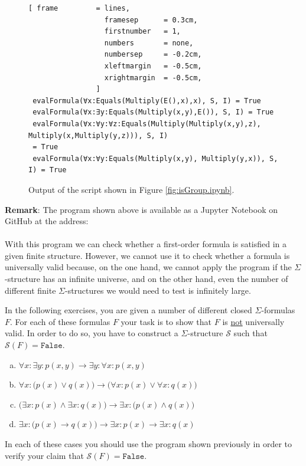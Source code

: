 \begin{figure}[!ht]
\centering
\begin{Verbatim}[ frame         = lines, 
                  framesep      = 0.3cm, 
                  firstnumber   = 1,
                  numbers       = none,
                  numbersep     = -0.2cm,
                  xleftmargin   = -0.5cm,
                  xrightmargin  = -0.5cm,
                ]
 evalFormula(∀x:Equals(Multiply(E(),x),x), S, I) = True
 evalFormula(∀x:∃y:Equals(Multiply(x,y),E()), S, I) = True
 evalFormula(∀x:∀y:∀z:Equals(Multiply(Multiply(x,y),z), Multiply(x,Multiply(y,z))), S, I)
 = True
 evalFormula(∀x:∀y:Equals(Multiply(x,y), Multiply(y,x)), S, I) = True
\end{Verbatim}
\vspace*{-0.3cm}
\caption{Output of the script shown in Figure \ref{fig:isGroup.ipynb}.}
\label{fig:isGroup.out}
\end{figure}
\noindent
\textbf{Remark}: The program shown above is available as a Jupyter Notebook on GitHub at the address:
\\[0.2cm]
\hspace*{0.0cm}
\href{https://github.com/karlstroetmann/Logic/blob/master/Python/Chapter-5/01-FOL-Evaluation.ipynb}{}
\\[0.2cm]
With this program we can check whether a
first-order formula is satisfied in a given finite structure. However, we cannot use it to check whether a
formula is universally valid because, on the one hand, we cannot apply the program if the $\Sigma$-structure has an
infinite universe, and on the other hand, even the number of different finite $\Sigma$-structures we would need
to test is infinitely large. \eox 

\exerciseEng
In the following exercises, you are given a number of different closed $\Sigma$-formulas $F$. For each of these
formulas $F$ your task is to show that $F$ is \underline{not} universally valid.  In order to do so,
you have to construct a $\Sigma$-structure $\mathcal{S}$ such that $\mathcal{S}(F) = \mathtt{False}$.
\begin{enumerate}[(a)]
\item $\forall x: \exists y: p(x,y) \rightarrow \exists y: \forall x: p(x,y)$
\item $\forall x: \bigl(p(x) \lor q(x)\bigr) \rightarrow \bigl(\forall x: p(x) \lor \forall x: q(x)\bigr)$
\item $\bigl(\exists x: p(x) \land \exists x: q(x)\bigr) \rightarrow \exists x: \bigl(p(x) \land q(x)\bigr)$
\item $\exists x: \bigl(p(x) \rightarrow q(x)\bigr) \rightarrow \exists x: p(x) \rightarrow \exists x: q(x)$
\end{enumerate}
In each of these cases you should use the program shown previously in order to verify your claim
that $\mathcal{S}(F) = \mathtt{False}$.

